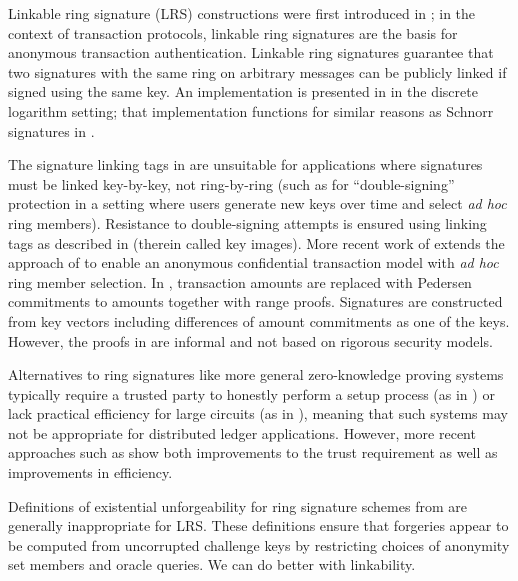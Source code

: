 \documentclass{llncs}
\begin{document}
Linkable ring signature (LRS) constructions were first introduced in \cite{liu2004linkable}; in the context of transaction protocols, linkable ring signatures are the basis for anonymous transaction authentication. Linkable ring signatures guarantee that two signatures with the same ring on arbitrary messages can be publicly linked if signed using the same key. An implementation is presented in \cite{liu2004linkable} in the discrete logarithm setting; that implementation functions for similar reasons as Schnorr signatures in \cite{schnorr1991efficient}.

The signature linking tags in \cite{liu2004linkable} are unsuitable for applications where signatures must be linked key-by-key, not ring-by-ring (such as for ``double-signing'' protection in a setting where users generate new keys over time and select \textit{ad hoc} ring members). Resistance to double-signing attempts is ensured using linking tags as described in \cite{van2013cryptonote} (therein called key images). More recent work of \cite{noether2016ring} extends the approach of \cite{liu2004linkable} to enable an anonymous confidential transaction model with \textit{ad hoc} ring member selection. In \cite{noether2016ring}, transaction amounts are replaced with Pedersen commitments to amounts together with range proofs. Signatures are constructed from key vectors including differences of amount commitments as one of the keys. However, the proofs in \cite{noether2016ring} are informal and not based on rigorous security models.

Alternatives to ring signatures like more general zero-knowledge proving systems typically require a trusted party to honestly perform a setup process (as in \cite{groth,ben2014succinct,groth2018updatable}) or lack practical efficiency for large circuits (as in \cite{bulletproofs}), meaning that such systems may not be appropriate for distributed ledger applications. However, more recent approaches such as \cite{hoffmann2019efficient} show both improvements to the trust requirement as well as improvements in efficiency.

Definitions of existential unforgeability for ring signature schemes from \cite{bender2006ring} are generally inappropriate for LRS. These definitions ensure that forgeries appear to be computed from uncorrupted challenge keys by restricting choices of anonymity set members and oracle queries. We can do better with linkability.
\end{document}
